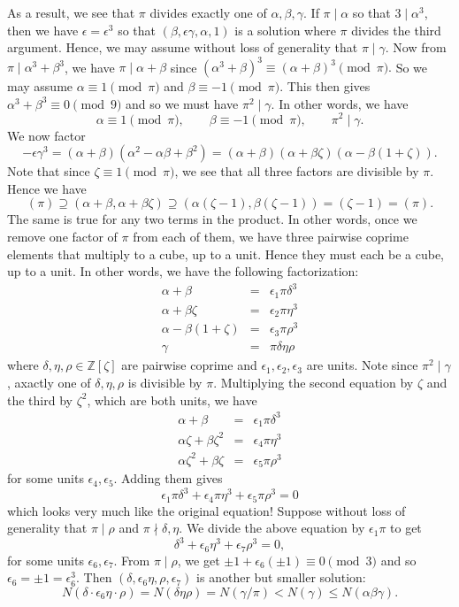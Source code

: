 \documentclass{article}
\def\Z{{\mathbb Z}}
\def\Z{{\mathbb Z}}
\begin{document}
As a result, we see that $\pi$ divides exactly one of $\alpha,\beta,\gamma$. If $\pi\mid\alpha$ so that $3\mid \alpha^3$, then we have $\epsilon = \epsilon^3$ so that $(\beta,\epsilon\gamma,\alpha,1)$ is a solution where $\pi$ divides the third argument. %
 Hence, we may assume without loss of generality that $\pi\mid\gamma$. Now from $\pi\mid \alpha^3 + \beta^3$, we have $\pi\mid \alpha + \beta$ since $(\alpha^3 + \beta)^3 \equiv (\alpha+\beta)^3\pmod{\pi}.$ So we may assume $\alpha\equiv 1\pmod{\pi}$ and $\beta\equiv -1\pmod{\pi}.$ This then gives $\alpha^3 + \beta^3\equiv 0\pmod{9}$ and so we must have $\pi^2\mid\gamma$. In other words, we have $$\alpha\equiv 1\pmod{\pi},\qquad\beta\equiv -1\pmod{\pi},\qquad\pi^2\mid\gamma.$$
 We now factor
$$
    -\epsilon\gamma^3 = (\alpha+\beta)(\alpha^2 - \alpha\beta + \beta^2)= (\alpha + \beta)(\alpha + \beta\zeta)(\alpha - \beta(1+\zeta)).
$$
Note that since $\zeta\equiv 1\pmod{\pi}$, we see that all three factors are divisible by $\pi$. Hence we have
$$(\pi) \supseteq (\alpha+\beta, \alpha+\beta\zeta) \supseteq (\alpha(\zeta-1),\beta(\zeta-1)) = (\zeta-1) = (\pi).$$
The same is true for any two terms in the product. In other words, once we remove one factor of $\pi$ from each of them, we have three pairwise coprime elements that multiply to a cube, up to a unit. Hence they must each be a cube, up to a unit. In other words, we have the following factorization: 
\begin{eqnarray*}
    \alpha + \beta &=& \epsilon_1\pi\delta^3\\
    \alpha + \beta\zeta &=& \epsilon_2\pi\eta^3\\
    \alpha - \beta(1+\zeta) &=& \epsilon_3\pi\rho^3\\
    \gamma &=&\pi\delta\eta\rho
\end{eqnarray*}
where $\delta,\eta,\rho\in\Z[\zeta]$ are pairwise coprime and $\epsilon_1,\epsilon_2,\epsilon_3$ are units. Note since $\pi^2\mid\gamma$, axactly one of $\delta, \eta, \rho$ is divisible by $\pi$.
Multiplying the second equation by $\zeta$ and the third by $\zeta^2$, which are both units, we have
\begin{eqnarray*}
    \alpha + \beta &=& \epsilon_1\pi\delta^3\\
    \alpha\zeta + \beta\zeta^2 &=& \epsilon_4\pi\eta^3\\
    \alpha\zeta^2 + \beta\zeta &=& \epsilon_5\pi\rho^3
\end{eqnarray*}
for some units $\epsilon_4,\epsilon_5$. Adding them gives
$$\epsilon_1\pi\delta^3 + \epsilon_4\pi\eta^3 + \epsilon_5\pi\rho^3 = 0$$
which looks very much like the original equation! Suppose without loss of generality that $\pi\mid\rho$ and $\pi\nmid\delta,\eta$. We divide the above equation by $\epsilon_1\pi$ to get
$$\delta^3 + \epsilon_6\eta^3 + \epsilon_7\rho^3 = 0,$$
for some units $\epsilon_6,\epsilon_7$. From $\pi\mid\rho$, we get $\pm1+\epsilon_6(\pm1)\equiv 0\pmod{3}$ and so $\epsilon_6 = \pm1 = \epsilon_6^3$. Then $(\delta, \epsilon_6\eta, \rho, \epsilon_7)$ is another but smaller solution:
$$N(\delta\cdot\epsilon_6\eta\cdot\rho) = N(\delta\eta\rho)  = N(\gamma/\pi) < N(\gamma) \leq N(\alpha\beta\gamma).$$
\end{document}
